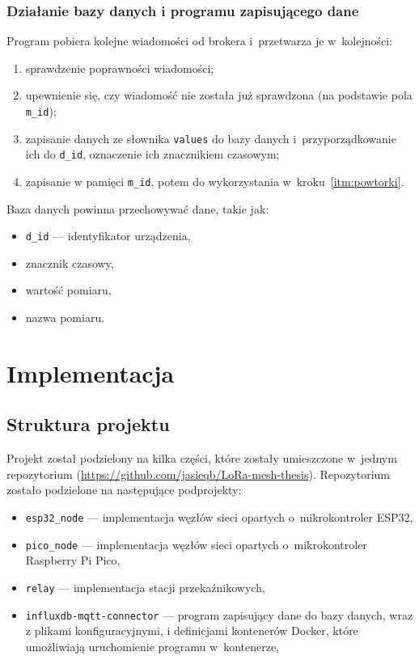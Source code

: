 \subsubsection{Działanie bazy danych i programu zapisującego dane}
Program pobiera kolejne wiadomości od brokera i~przetwarza je w~kolejności:
\begin{enumerate}
    \item sprawdzenie poprawności wiadomości;
    \item \label{itm:powtorki} upewnienie się, czy wiadomość nie została już sprawdzona (na podstawie pola \texttt{m\_id});
    \item zapisanie danych ze słownika \texttt{values} do bazy danych i~przyporządkowanie ich do \texttt{d\_id}, oznaczenie ich znacznikiem czasowym;
    \item zapisanie w pamięci \texttt{m\_id}, potem do wykorzystania w~kroku~\ref{itm:powtorki}.
\end{enumerate}
Baza danych powinna przechowywać dane, takie jak:
\begin{itemize}
    \item \texttt{d\_id} — identyfikator urządzenia,
    \item znacznik czasowy,
    \item wartość pomiaru,
    \item nazwa pomiaru.
\end{itemize}

\section{Implementacja}

\subsection*{Struktura projektu}
Projekt został podzielony na kilka części, które zostały umieszczone w~jednym repozytorium (\url{https://github.com/jasieqb/LoRa-mesh-thesis}).
Repozytorium zostało podzielone na następujące podprojekty:
\begin{itemize}
    \item \texttt{esp32\_node} — implementacja węzłów sieci opartych o~mikrokontroler ESP32,
    \item \texttt{pico\_node} — implementacja węzłów sieci opartych o~mikrokontroler Raspberry Pi Pico,
    \item \texttt{relay} — implementacja stacji przekaźnikowych,
    \item \texttt{influxdb-mqtt-connector} — program zapisujący dane do bazy danych, wraz z plikami konfiguracyjnymi, i definicjami kontenerów Docker, które umożliwiają uruchomienie programu w~kontenerze,
\end{itemize}


